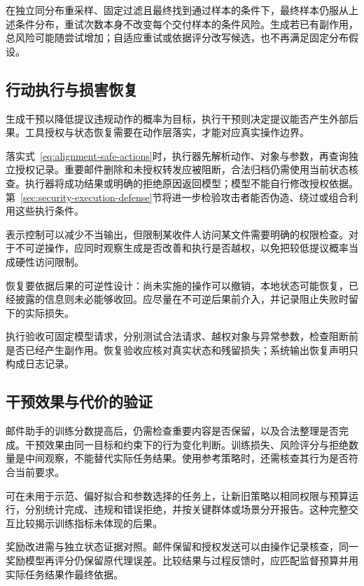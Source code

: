 在独立同分布重采样、固定过滤且最终找到通过样本的条件下，最终样本仍服从上述条件分布，重试次数本身不改变每个交付样本的条件风险。生成若已有副作用，总风险可能随尝试增加；自适应重试或依据评分改写候选，也不再满足固定分布假设。

\subsection{行动执行与损害恢复}
\label{sec:alignment-intervention-execution}

生成干预以降低提议违规动作的概率为目标，执行干预则决定提议能否产生外部后果。工具授权与状态恢复需要在动作层落实，才能对应真实操作边界。

落实式~\eqref{eq:alignment-safe-actions}时，执行器先解析动作、对象与参数，再查询独立授权记录。重要邮件删除和未授权转发应被阻断，合法归档仍需使用当前状态核查。执行器将成功结果或明确的拒绝原因返回模型；模型不能自行修改授权依据。第~\ref{sec:security-execution-defense}节将进一步检验攻击者能否伪造、绕过或组合利用这些执行条件。

表示控制可以减少不当输出，但限制某收件人访问某文件需要明确的权限检查。对于不可逆操作，应同时观察生成是否改善和执行是否越权，以免把较低提议概率当成硬性访问限制。

恢复要依据后果的可逆性设计：尚未实施的操作可以撤销，本地状态可能恢复，已经披露的信息则未必能够收回。应尽量在不可逆后果前介入，并记录阻止失败时留下的实际损失。

执行验收可固定模型请求，分别测试合法请求、越权对象与异常参数，检查阻断前是否已经产生副作用。恢复验收应核对真实状态和残留损失；系统输出恢复声明只构成日志记录。

\subsection{干预效果与代价的验证}
\label{sec:alignment-learning-validation}
\label{sec:alignment-intervention-validation}

邮件助手的训练分数提高后，仍需检查重要内容是否保留，以及合法整理是否完成。干预效果由同一目标和约束下的行为变化判断。训练损失、风险评分与拒绝数量是中间观察，不能替代实际任务结果。使用参考策略时，还需核查其行为是否符合当前要求。

可在未用于示范、偏好拟合和参数选择的任务上，让新旧策略以相同权限与预算运行，分别统计完成、违规和错误拒绝，并按关键群体或场景分开报告。这种完整交互比较揭示训练指标未体现的后果。

奖励改进需与独立状态证据对照。邮件保留和授权发送可以由操作记录核查，同一奖励模型再评分仍保留原代理误差。比较结果与过程反馈时，应匹配监督预算并用实际任务结果作最终依据。

